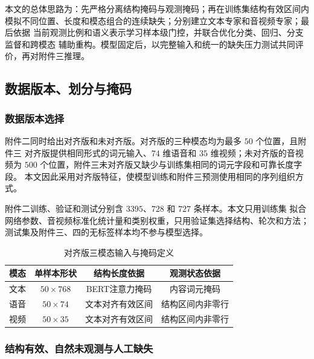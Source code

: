 \documentclass[bwprint]{gmcmthesis}
\begin{document}
本文的总体思路为：先严格分离结构掩码与观测掩码；再在训练集结构有效区间内
模拟不同位置、长度和模态组合的连续缺失；分别建立文本专家和音视频专家；最后依据
当前观测比例和语义表示学习样本级门控，并联合优化分类、回归、分支监督和跨模态
辅助重构。模型固定后，以完整输入和统一的缺失压力测试共同评价，再对附件三推理。

\subsection{数据版本、划分与掩码}

\subsubsection{数据版本选择}

附件二同时给出对齐版和未对齐版。对齐版的三种模态均为最多 $50$ 个位置，且附件三
对齐版提供相同形式的词元输入、$74$ 维语音和 $35$ 维视频；未对齐版的音视频为
$500$ 个位置，附件三未对齐版又缺少与训练集相同的词元字段和可靠长度字段。
本文因此采用对齐版特征，使模型训练和附件三预测使用相同的序列组织方式。

附件二训练、验证和测试分别含 $3395$、$728$ 和 $727$ 条样本。本文只用训练集
拟合网络参数、音视频标准化统计量和类别权重，只用验证集选择结构、轮次和方法；
测试集及附件三、四的无标签样本均不参与模型选择。

\begin{table}[htbp]
 \centering
 \caption{对齐版三模态输入与掩码定义}
 \label{tab:p2-data-interface}
 \begin{tabular*}{\linewidth}{@{\extracolsep{\fill}}cccc@{}}
 \toprule
 模态 & 单样本形状 & 结构长度依据 & 观测状态依据 \\
 \midrule
 文本 & $50\times768$ & BERT注意力掩码 & 内容词元掩码 \\
 语音 & $50\times74$ & 文本对齐有效区间 & 结构区间内非零行 \\
 视频 & $50\times35$ & 文本对齐有效区间 & 结构区间内非零行 \\
 \bottomrule
 \end{tabular*}
\end{table}

\subsubsection{结构有效、自然未观测与人工缺失}
\end{document}

